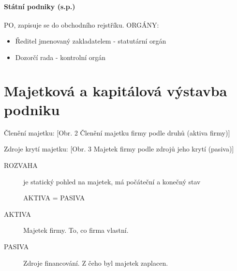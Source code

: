\documentclass[11pt,a4paper,twoside]{book}
\begin{document}
				\subsubsection{Státní podniky (s.p.)}
					PO, zapisuje se do obchodního rejstříku.
					ORGÁNY:
						\begin{itemize}
							\item Ředitel jmenovaný zakladatelem - statutární orgán
							\item Dozorčí rada - kontrolní orgán
						\end{itemize}

	\chapter{Majetková a kapitálová výstavba podniku}

	Členění majetku:
	[Obr. 2 Členění majetku firmy podle druhů (aktiva firmy)]

	Zdroje krytí majetku:
	[Obr. 3 Majetek firmy podle zdrojů jeho krytí (pasiva)]
	\begin{description}
		\item[ROZVAHA] je statický pohled na majetek, má počáteční a konečný stav \par
			\begin{center}
				{\Large AKTIVA = PASIVA}
			\end{center}
		\item[AKTIVA] Majetek firmy. To, co firma vlastní.
		\item[PASIVA] Zdroje financování. Z čeho byl majetek zaplacen.
	\end{description}
\end{document}
